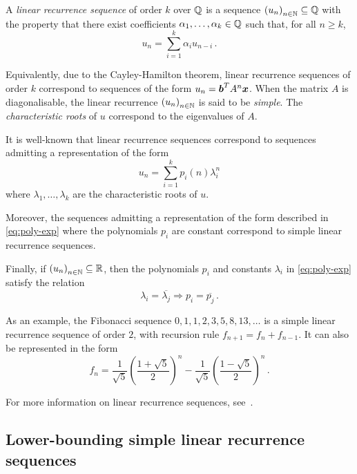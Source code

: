 A \emph{linear recurrence sequence} of order $k$ over $\mathbb{Q}$ is a sequence ${(u_{n})}_{n \in \mathbb{N}} \subseteq \mathbb{Q}$ with the property that there exist coefficients $\alpha_{1}, \ldots, \alpha_{k} \in \mathbb{Q}$ such that, for all $n \geq k$,
\begin{equation*}
  u_{n} = \sum\limits_{i=1}^{k} \alpha_{i} u_{n-i}\, .
\end{equation*}

Equivalently, due to the Cayley-Hamilton theorem, linear recurrence sequences of order $k$ correspond to sequences of the form $u_{n} = \boldsymbol{b}^{T} A^{n} \boldsymbol{x}$. When the matrix $A$ is diagonalisable, the linear recurrence ${(u_{n})}_{n \in \mathbb{N}}$ is said to be \emph{simple}. The \emph{characteristic roots} of $u$ correspond to the eigenvalues of $A$.

It is well-known that linear recurrence sequences correspond to sequences admitting a representation of the form
\begin{equation}
  \label{eq:poly-exp}
  u_{n} = \sum\limits_{i=1}^{k} p_{i}(n) \lambda_{i}^{n}
\end{equation}
where $\lambda_{1}, \ldots, \lambda_{k}$ are the characteristic roots of $u$.

Moreover, the sequences admitting a representation of the form described in \cref{eq:poly-exp} where the polynomials $p_{i}$ are constant correspond to simple linear recurrence sequences.

Finally, if ${(u_{n})}_{n \in \mathbb{N}} \subseteq \mathbb{R}$, then the polynomials $p_{i}$ and constants $\lambda_{i}$ in \cref{eq:poly-exp} satisfy the relation
\begin{equation*}
  \label{eq:real_property}
  \lambda_{i} = \overline{\lambda_{j}} \Rightarrow p_{i} = \overline{p_{j}} \, .
\end{equation*}

As an example, the Fibonacci sequence $0, 1, 1, 2, 3, 5, 8, 13, \ldots$ is a simple linear recurrence sequence of order $2$, with recursion rule $f_{n+1} = f_{n} + f_{n-1}$. It can also be represented in the form
\begin{equation*}
  f_{n} = \frac{1}{\sqrt{5}} {\left(\frac{1+\sqrt{5}}{2} \right)}^{n} - \frac{1}{\sqrt{5}} {\left( \frac{1-\sqrt{5}}{2} \right)}^{n} \, .
\end{equation*}

For more information on linear recurrence sequences, see~\cite{BOOK}.

\subsection{Lower-bounding simple linear recurrence sequences}
\label{sec:s-units-app}

